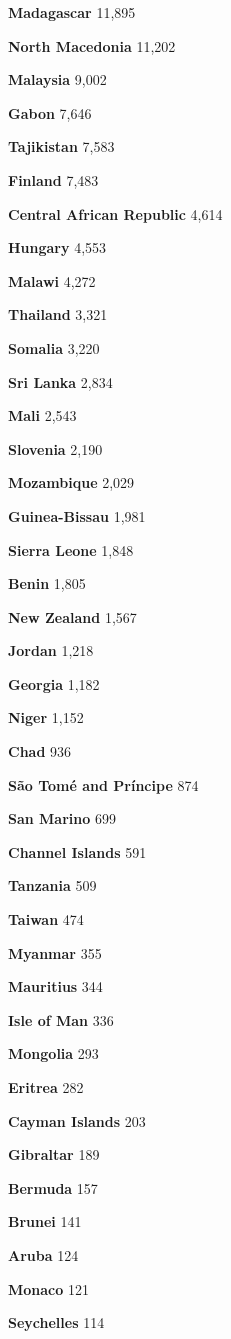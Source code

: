 \textbf{Madagascar} 11,895

\textbf{North Macedonia} 11,202

\textbf{Malaysia} 9,002

\textbf{Gabon} 7,646

\textbf{Tajikistan} 7,583

\textbf{Finland} 7,483

\textbf{Central African Republic} 4,614

\textbf{Hungary} 4,553

\textbf{Malawi} 4,272

\textbf{Thailand} 3,321

\textbf{Somalia} 3,220

\textbf{Sri Lanka} 2,834

\textbf{Mali} 2,543

\textbf{Slovenia} 2,190

\textbf{Mozambique} 2,029

\textbf{Guinea-Bissau} 1,981

\textbf{Sierra Leone} 1,848

\textbf{Benin} 1,805

\textbf{New Zealand} 1,567

\textbf{Jordan} 1,218

\textbf{Georgia} 1,182

\textbf{Niger} 1,152

\textbf{Chad} 936

\textbf{São Tomé and Príncipe} 874

\textbf{San Marino} 699

\textbf{Channel Islands} 591

\textbf{Tanzania} 509

\textbf{Taiwan} 474

\textbf{Myanmar} 355

\textbf{Mauritius} 344

\textbf{Isle of Man} 336

\textbf{Mongolia} 293

\textbf{Eritrea} 282

\textbf{Cayman Islands} 203

\textbf{Gibraltar} 189

\textbf{Bermuda} 157

\textbf{Brunei} 141

\textbf{Aruba} 124

\textbf{Monaco} 121

\textbf{Seychelles} 114

